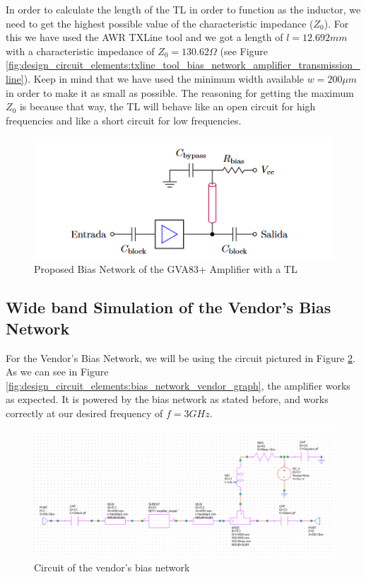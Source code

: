\documentclass[12pt]{report} %
\begin{document}
In order to calculate the length of the TL in order to function as the inductor, we need to get the highest possible value of the characteristic impedance ($Z_0$). For this we have used the AWR TXLine tool and we got a length of $l = 12.692 mm$ with a characteristic impedance of $Z_0 = 130.62 \Omega$ (see Figure \ref{fig:design_circuit_elements:txline_tool_bias_network_amplifier_transmission_line}). Keep in mind that we have used the minimum width available $w = 200 \mu m$ in order to make it as small as possible. The reasoning for getting the maximum $Z_0$ is because that way, the TL will behave like an open circuit for high frequencies and like a short circuit for low frequencies.

\begin{figure}[htbp]
    \centering
    \includegraphics[width=\textwidth]{images/design_circuit_elements/gva83+_bias_transmission_line.png}
    \caption{Proposed Bias Network of the GVA83+ Amplifier with a TL}
    \label{fig:design_circuit_elements:gva83+_bias_transmission_line}
\end{figure}

\subsection{Wide band Simulation of the Vendor's Bias Network}

For the Vendor's Bias Network, we will be using the circuit pictured in Figure \ref{fig:design_circuit_elements:bias_network_vendor_circuit}. As we can see in Figure \ref{fig:design_circuit_elements:bias_network_vendor_graph}, the amplifier works as expected. It is powered by the bias network as stated before, and works correctly at our desired frequency of $f = 3 GHz$.

\begin{figure}[htbp]
    \centering
    \includegraphics[width=1\linewidth]{images//design_circuit_elements/bias_network_vendor_circuit.png}
    \caption{Circuit of the vendor's bias network}
    \label{fig:design_circuit_elements:bias_network_vendor_circuit}
\end{figure}
\end{document}
